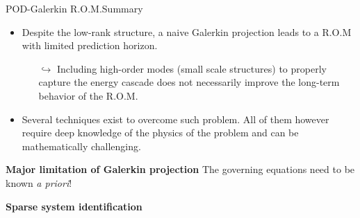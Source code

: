 \documentclass[usenames,dvipsnames,svgnames,10pt,aspectratio=169]{beamer}
\begin{document}
\begin{frame}[t, c]{POD-Galerkin R.O.M.}{Summary}
	\begin{itemize}
		\item Despite the low-rank structure, a naive Galerkin projection leads to a R.O.M with limited prediction horizon.
		\begin{itemize}
			\item[$\hookrightarrow$] Including high-order modes (small scale structures) to properly capture the energy cascade does not necessarily improve the long-term behavior of the R.O.M.
		\end{itemize}

		\bigskip

		\item Several techniques exist to overcome such problem. All of them however require deep knowledge of the physics of the problem and can be mathematically challenging.
	\end{itemize}

	\bigskip

	\begin{block}{\center \textbf{Major limitation of Galerkin projection}}
		\centering
		The governing equations need to be known \emph{a priori}!
	\end{block}

	\vspace{1cm}
\end{frame}



\begin{frame}[t, c]
	\centering
	\vspace{1cm}
	{\Large \textbf{Sparse system identification}}
\end{frame}
\end{document}
